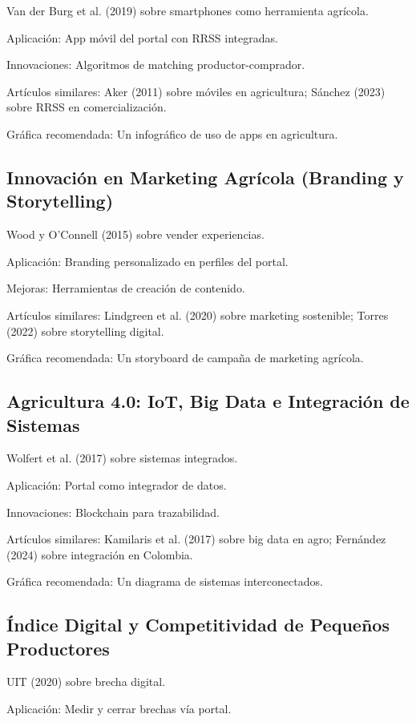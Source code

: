 Van der Burg et al. (2019) sobre smartphones como herramienta agrícola.

Aplicación: App móvil del portal con RRSS integradas.

Innovaciones: Algoritmos de matching productor-comprador.

Artículos similares: Aker (2011) sobre móviles en agricultura; Sánchez (2023) sobre RRSS en comercialización.

Gráfica recomendada: Un infográfico de uso de apps en agricultura.

\subsection{Innovación en Marketing Agrícola (Branding y Storytelling)}

Wood y O'Connell (2015) sobre vender experiencias.

Aplicación: Branding personalizado en perfiles del portal.

Mejoras: Herramientas de creación de contenido.

Artículos similares: Lindgreen et al. (2020) sobre marketing sostenible; Torres (2022) sobre storytelling digital.

Gráfica recomendada: Un storyboard de campaña de marketing agrícola.

\subsection{Agricultura 4.0: IoT, Big Data e Integración de Sistemas}

Wolfert et al. (2017) sobre sistemas integrados.

Aplicación: Portal como integrador de datos.

Innovaciones: Blockchain para trazabilidad.

Artículos similares: Kamilaris et al. (2017) sobre big data en agro; Fernández (2024) sobre integración en Colombia.

Gráfica recomendada: Un diagrama de sistemas interconectados.

\subsection{Índice Digital y Competitividad de Pequeños Productores}

UIT (2020) sobre brecha digital.

Aplicación: Medir y cerrar brechas vía portal.

